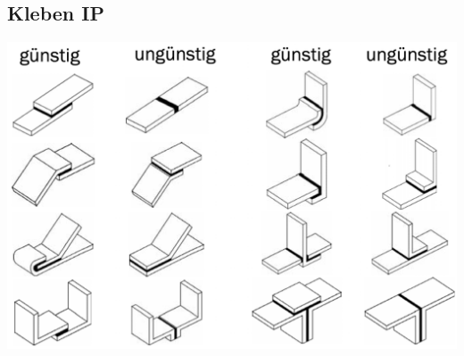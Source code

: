 \subsection{Kleben \hfill IP}
    \begin{footnotesize}
        \begin{center}
            \includegraphics[width = 0.6\linewidth]{MAEIP_Kleben}
        \end{center}
    \end{footnotesize}
